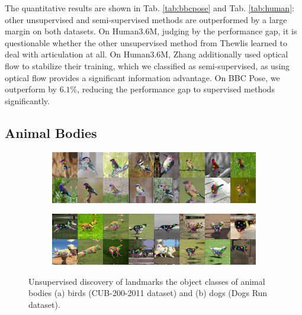 			The quantitative results are shown in Tab. \ref{tab:bbcpose} and Tab. \ref{tab:human}: other unsupervised and semi-supervised methods are outperformed by a large margin on both datasets.
			On Human3.6M, judging by the performance gap, it is questionable whether the other unsupervised method from Thewlis \etal \cite{thewlis17} learned to deal with articulation at all.
			On Human3.6M, Zhang \etal \cite{zhang18} additionally used optical flow to stabilize their training, which we classified as semi-supervised, as using optical flow provides a significant information advantage.
			On BBC Pose, we outperform \cite{jakab18} by $6.1\%$, reducing the performance gap to supervised methods significantly.





	\subsection{Animal Bodies}
		\begin{figure}[htp]
			\centering
			\begin{subfigure}{1.\textwidth}
			\includegraphics[trim={0cm 0cm 0cm 0cm},clip, width=1.\linewidth]{fig/shape/0birds}\caption{}
			\end{subfigure}
			\begin{subfigure}{1.\textwidth}
			\includegraphics[trim={0cm 0cm 0cm 0cm},clip, width=1.\linewidth]{fig/shape/0dogs}\caption{}
			\end{subfigure}
			\caption{{Unsupervised discovery of landmarks the object classes of animal bodies (a) birds (CUB-200-2011 dataset) and (b) dogs (Dogs Run dataset).}}
			\label{fig:kp_animals}
		\end{figure}

